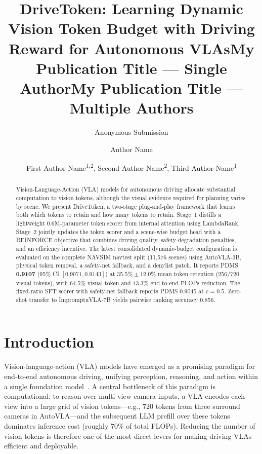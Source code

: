 \documentclass[letterpaper]{article} %
\title{DriveToken: Learning Dynamic Vision Token Budget with Driving Reward for Autonomous VLAs}
\author{
    Anonymous Submission
}
\title{My Publication Title --- Single Author}
\author {
    Author Name
}
\title{My Publication Title --- Multiple Authors}
\author {
    First Author Name\textsuperscript{\rm 1,\rm 2}\equalcontrib,
    Second Author Name\textsuperscript{\rm 2}\equalcontrib,
    Third Author Name\textsuperscript{\rm 1}\corresponding
}
\begin{document}
\maketitle

\begin{abstract}
Vision-Language-Action (VLA) models for autonomous driving allocate substantial computation to vision tokens, although the visual evidence required for planning varies by scene. We present DriveToken, a two-stage plug-and-play framework that learns both which tokens to retain and how many tokens to retain. Stage~1 distills a lightweight 0.6M-parameter token scorer from internal attention using LambdaRank. Stage~2 jointly updates the token scorer and a scene-wise budget head with a REINFORCE objective that combines driving quality, safety-degradation penalties, and an efficiency incentive. The latest consolidated dynamic-budget configuration is evaluated on the complete NAVSIM navtest split (11,576 scenes) using AutoVLA-3B, physical token removal, a safety-net fallback, and a denylist patch. It reports PDMS \textbf{0.9107} (95\% CI $[0.9071,0.9143]$) at $35.5\%\pm12.0\%$ mean token retention ($256/720$ visual tokens), with 64.5\% visual-token and 43.3\% end-to-end FLOPs reduction. The fixed-ratio SFT scorer with safety-net fallback reports PDMS 0.9045 at $r{=}0.5$. Zero-shot transfer to ImpromptuVLA-7B yields pairwise ranking accuracy 0.856.
\end{abstract}


\newcommand{\ours}{DriveToken}
\newcommand{\best}[1]{\textbf{#1}}
\newcommand{\shard}{$^{\dagger}$}

\section{Introduction}
\label{sec:intro}

Vision-language-action (VLA) models have emerged as a promising paradigm for
end-to-end autonomous driving, unifying perception, reasoning, and action within
a single foundation model~\citep{openvla2024}.
A central bottleneck of this paradigm is computational: to reason over
multi-view camera inputs, a VLA encodes each view into a large grid of vision
tokens---e.g., 720 tokens from three surround cameras in AutoVLA---and the
subsequent LLM prefill over these tokens dominates inference cost (roughly 70\%
of total FLOPs).
Reducing the number of vision tokens is therefore one of the most direct levers
for making driving VLAs efficient and deployable.
\end{document}
